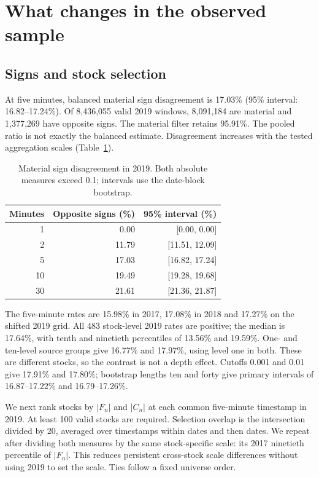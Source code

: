\documentclass[11pt]{article}
\begin{document}
\section{What changes in the observed sample}
\subsection{Signs and stock selection}
At five minutes, balanced material sign disagreement is 17.03\% (95\% interval: 16.82--17.24\%). Of 8,436,055 valid 2019 windows, 8,091,184 are material and 1,377,269 have opposite signs. The material filter retains 95.91\%. The pooled ratio is not exactly the balanced estimate. Disagreement increases with the tested aggregation scales (Table~\ref{tab:scale}).

\begin{table}[htbp]
\centering
\caption{Material sign disagreement in 2019. Both absolute measures exceed 0.1; intervals use the date-block bootstrap.}
\label{tab:scale}
\begin{tabular}{rrr}
\toprule Minutes&Opposite signs (\%)&95\% interval (\%)\\\midrule
1&0.00&[0.00, 0.00]\\
2&11.79&[11.51, 12.09]\\
5&17.03&[16.82, 17.24]\\
10&19.49&[19.28, 19.68]\\
30&21.61&[21.36, 21.87]\\\bottomrule
\end{tabular}
\end{table}

The five-minute rates are 15.98\% in 2017, 17.08\% in 2018 and 17.27\% on the shifted 2019 grid. All 483 stock-level 2019 rates are positive; the median is 17.64\%, with tenth and ninetieth percentiles of 13.56\% and 19.59\%. One- and ten-level source groups give 16.77\% and 17.97\%, using level one in both. These are different stocks, so the contrast is not a depth effect. Cutoffs 0.001 and 0.01 give 17.91\% and 17.80\%; bootstrap lengths ten and forty give primary intervals of 16.87--17.22\% and 16.79--17.26\%.

We next rank stocks by $|F_n|$ and $|C_n|$ at each common five-minute timestamp in 2019. At least 100 valid stocks are required. Selection overlap is the intersection divided by 20, averaged over timestamps within dates and then dates. We repeat after dividing both measures by the same stock-specific scale: its 2017 ninetieth percentile of $|F_n|$. This reduces persistent cross-stock scale differences without using 2019 to set the scale. Ties follow a fixed universe order.
\end{document}
